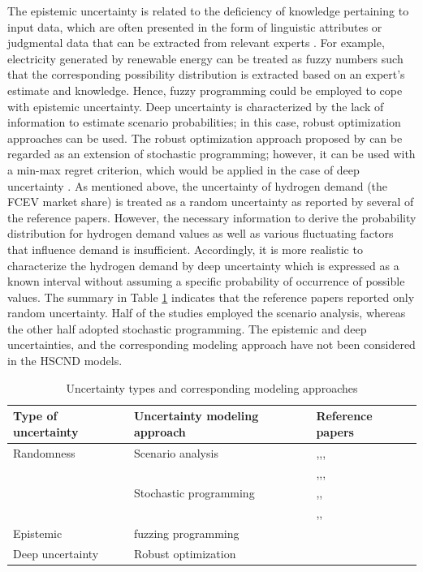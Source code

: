 \documentclass[11pt,3p]{elsarticle}
\begin{document}
The epistemic uncertainty is related to the deficiency of knowledge pertaining to input data, which are often presented in the form of linguistic attributes or judgmental data that can be extracted from relevant experts \citep{bairamzadeh2018modelling}. For example, electricity generated by renewable energy can be treated as fuzzy numbers such that the corresponding possibility distribution is extracted based on an expert's estimate and knowledge. Hence, fuzzy programming could be employed to cope with epistemic uncertainty. Deep uncertainty is characterized by the lack of information to estimate scenario probabilities; in this case, robust optimization approaches can be used. The robust optimization approach proposed by \citet{mulvey1995robust} can be regarded as an extension of stochastic programming; however, it can be used with a min-max regret criterion, which would be applied in the case of deep uncertainty \citep{klibi2010design}. As mentioned above, the uncertainty of hydrogen demand (the FCEV market share) is treated as a random uncertainty as reported by several of the reference papers. However, the necessary information to derive the probability distribution for hydrogen demand values as well as various fluctuating factors that influence demand is insufficient. Accordingly, it is more realistic to characterize the hydrogen demand by deep uncertainty which is expressed as a known interval without assuming a specific probability of occurrence of possible values. The summary in Table \ref{tab:UncertaintyTypes} indicates that the reference papers reported only random uncertainty. Half of the studies employed the scenario analysis, whereas the other half adopted stochastic programming. The epistemic and deep uncertainties, and the corresponding modeling approach have not been considered in the HSCND models.

\begin{table}[!htbp]
\centering
\caption{Uncertainty types and corresponding modeling approaches}
\label{tab:UncertaintyTypes}
\begin{tabular}{lll}
\hline
Type of uncertainty & Uncertainty modeling approach & Reference papers \\ \hline
Randomness & Scenario analysis & \citep{agnolucci2013importance},\citep{almaraz2014hydrogen},\citep{cho2016optimization},\citep{han2012modeling} \\
 &  & \citep{kim2008strategic},\citep{konda2011optimal},\citep{kim2016optimization},\citep{kim2017integrated} \\
 & Stochastic programming & \citep{almansoori2012design},\citep{dayhim2014planning},\citep{hwangbo2017mathematical} \\
 &  & \citep{kim2008optimization},\citep{nunes2015design},\citep{sabio2010strategic} \\
Epistemic & fuzzing programming &  \\
Deep uncertainty & Robust optimization &  \\ \hline
\end{tabular}
\end{table}
\end{document}
